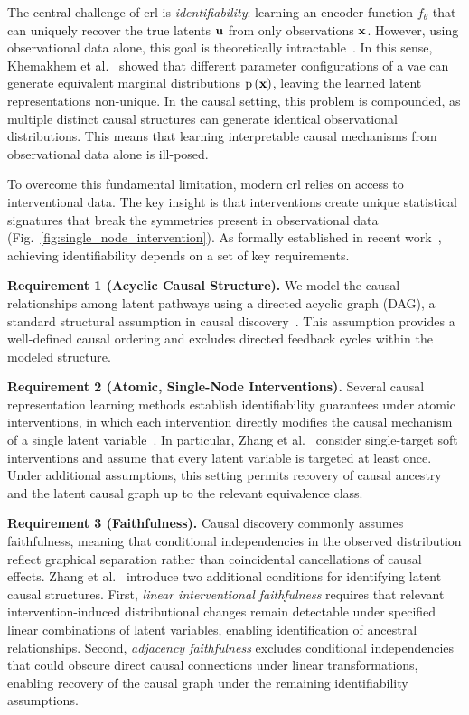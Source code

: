 \documentclass[10pt,letterpaper]{article}
\theoremstyle{definition}
\theoremstyle{remark}
\newcommand{\variables}{\rvx}
\newcommand{\latentcausalvars}{\rvu}
\newcommand{\practicalencoder}{f_\theta}
\newcommand{\pdf}[1]{\operatorname{p}\left(#1\right)}
\begin{document}
The central challenge of \gls{crl} is \emph{identifiability}: learning an encoder function $\practicalencoder$ that can uniquely recover the true latents $\latentcausalvars$ from only observations $\variables$.
However, using observational data alone, this goal is theoretically intractable~\cite{pearl2009causality}.
In this sense, Khemakhem et al.~\cite{khemakhem2020variational} showed that different parameter configurations of a \gls{vae} can generate equivalent marginal distributions $\pdf{\variables}$, leaving the learned latent representations non-unique.
In the causal setting, this problem is compounded, as multiple distinct causal structures can generate identical observational distributions.
This means that learning interpretable causal mechanisms from observational data alone is ill-posed.

To overcome this fundamental limitation, modern \gls{crl} relies on access to interventional data.
The key insight is that interventions create unique statistical signatures that break the symmetries present in observational data (Fig.~\ref{fig:single_node_intervention}).
As formally established in recent work~\cite{scholkopf2021toward}, achieving identifiability depends on a set of key requirements.

\textbf{Requirement 1 (Acyclic Causal Structure).}
We model the causal relationships among latent pathways using a directed acyclic graph (DAG), a standard structural assumption in causal discovery~\cite{pearl2009causality}.
This assumption provides a well-defined causal ordering and excludes directed feedback cycles within the modeled structure.

\textbf{Requirement 2 (Atomic, Single-Node Interventions).}
Several causal representation learning methods establish identifiability guarantees under atomic interventions, in which each intervention directly modifies the causal mechanism of a single latent variable~\cite{zhang2023identifiability,von2023nonparametric}.
In particular, Zhang et al.~\cite{zhang2023identifiability} consider single-target soft interventions and assume that every latent variable is targeted at least once.
Under additional assumptions, this setting permits recovery of causal ancestry and the latent causal graph up to the relevant equivalence class.

\textbf{Requirement 3 (Faithfulness).}
Causal discovery commonly assumes faithfulness, meaning that conditional independencies in the observed distribution reflect graphical separation rather than coincidental cancellations of causal effects.
Zhang et al.~\cite{zhang2023identifiability} introduce two additional conditions for identifying latent causal structures.
First, \emph{linear interventional faithfulness} requires that relevant intervention-induced distributional changes remain detectable under specified linear combinations of latent variables, enabling identification of ancestral relationships.
Second, \emph{adjacency faithfulness} excludes conditional independencies that could obscure direct causal connections under linear transformations, enabling recovery of the causal graph under the remaining identifiability assumptions.
\end{document}
